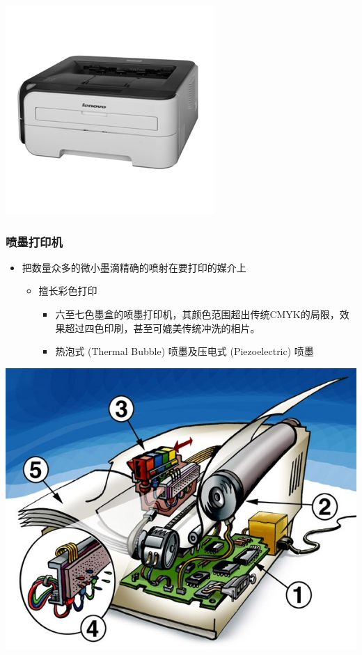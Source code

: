 \documentclass{beamer}
\newcommand{\fullPageImage}[2]{
	{
		\usebackgroundtemplate{\texttt{[image: \#1]}}
		\frame[plain]{#2}
	}
}
\begin{document}
\begin{frame}
\begin{center}
	\includegraphics[width=.3\textwidth]{images/laser-printer.jpg} 
	\end{center}
\end{frame}

\fullPageImage{images/800px-Tandy1000HX.jpg}{\transwipe}%

\begin{frame}
	\frametitle{喷墨打印机}
	\begin{itemize}
		\item 把数量众多的微小墨滴精确的喷射在要打印的媒介上
		\begin{itemize}
			\item 擅长彩色打印
			\begin{itemize}
				\item 六至七色墨盒的喷墨打印机，其颜色范围超出传统CMYK的局限，效果超过四色印刷，甚至可媲美传统冲洗的相片。
				\item 热泡式 (Thermal Bubble) 喷墨及压电式 (Piezoelectric) 喷墨
			\end{itemize}
		\end{itemize}
	\end{itemize}
	\begin{center}
	\includegraphics[height=.5\textheight]{images/bubblejet-print-principle.jpg}%
	\end{center}
\end{frame}
\end{document}

